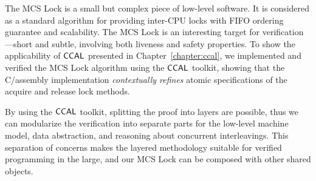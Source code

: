 


The MCS Lock is a small but complex piece of low-level software.
It is considered as a standard algorithm for providing inter-CPU locks with FIFO ordering guarantee and scalability.
The MCS Lock is an interesting target for verification---short and subtle, involving both liveness and safety properties. 
To show the applicability of $\mathsf{CCAL}$ presented in Chapter~\ref{chapter:ccal},
we implemented and verified the MCS Lock algorithm using the $\mathsf{CCAL}$ toolkit, 
showing that the C/assembly implementation {\em contextually refines} atomic specifications of the acquire and release lock methods.

By using the $\mathsf{CCAL}$ toolkit, splitting the proof into layers are possible,
thus we can modularize the verification into separate parts for the low-level machine model, data abstraction, and reasoning about concurrent interleavings.
 This separation of concerns makes the layered methodology suitable for verified programming in the large, and our 
MCS Lock can be composed with other shared objects.

